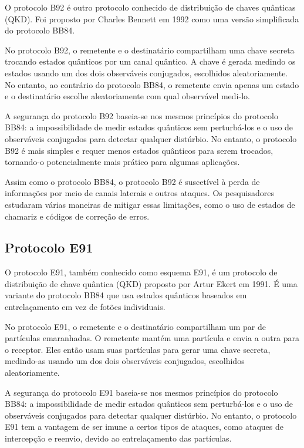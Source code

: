 O protocolo B92 é outro protocolo conhecido de distribuição de chaves quânticas (QKD). Foi proposto por Charles Bennett em 1992 como uma versão simplificada do protocolo BB84.

No protocolo B92, o remetente e o destinatário compartilham uma chave secreta trocando estados quânticos por um canal quântico. A chave é gerada medindo os estados usando um dos dois observáveis conjugados, escolhidos aleatoriamente. No entanto, ao contrário do protocolo BB84, o remetente envia apenas um estado e o destinatário escolhe aleatoriamente com qual observável medi-lo.

A segurança do protocolo B92 baseia-se nos mesmos princípios do protocolo BB84: a impossibilidade de medir estados quânticos sem perturbá-los e o uso de observáveis conjugados para detectar qualquer distúrbio. No entanto, o protocolo B92 é mais simples e requer menos estados quânticos para serem trocados, tornando-o potencialmente mais prático para algumas aplicações.

Assim como o protocolo BB84, o protocolo B92 é suscetível à perda de informações por meio de canais laterais e outros ataques. Os pesquisadores estudaram várias maneiras de mitigar essas limitações, como o uso de estados de chamariz e códigos de correção de erros.

\subsection{Protocolo E91}

O protocolo E91, também conhecido como esquema E91, é um protocolo de distribuição de chave quântica (QKD) proposto por Artur Ekert em 1991. É uma variante do protocolo BB84 que usa estados quânticos baseados em entrelaçamento em vez de fotões individuais.

No protocolo E91, o remetente e o destinatário compartilham um par de partículas emaranhadas. O remetente mantém uma partícula e envia a outra para o receptor. Eles então usam suas partículas para gerar uma chave secreta, medindo-as usando um dos dois observáveis conjugados, escolhidos aleatoriamente.

A segurança do protocolo E91 baseia-se nos mesmos princípios do protocolo BB84: a impossibilidade de medir estados quânticos sem perturbá-los e o uso de observáveis conjugados para detectar qualquer distúrbio. No entanto, o protocolo E91 tem a vantagem de ser imune a certos tipos de ataques, como ataques de intercepção e reenvio, devido ao entrelaçamento das partículas.

